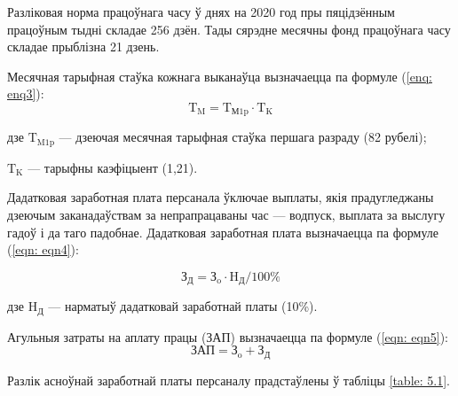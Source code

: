 Разліковая норма працоўнага часу ў днях на 2020 год пры пяцідзённым працоўным тыдні складае 256 дзён. Тады сярэдне месячны фонд працоўнага часу складае прыблізна 21 дзень.

Месячная тарыфная стаўка кожнага выканаўца вызначаецца па
формуле (\ref{enq: enq3}):
\begin{equation}
    \label{enq: enq3}
    \text{T}_\text{M} = \text{T}_\text{М1p} \cdot \text{T}_\text{K}
\end{equation}
\begin{Explanation}
    \item[дзе] $\text{T}_\text{M1p}$ --- дзеючая месячная тарыфная стаўка першага разраду (82 рубелі);
    \item $\text{T}_\text{K}$ --- тарыфны каэфіцыент (1,21).
\end{Explanation}

Дадатковая заработная плата персанала ўключае выплаты, якія
прадугледжаны дзеючым заканадаўствам за непрапрацаваны час ---
водпуск, выплата за выслугу гадоў і да таго падобнае.
Дадатковая заработная плата вызначаецца па формуле (\ref{eqn: eqn4}):

\begin{equation}
    \label{eqn: eqn4}
    \text{З}_\text{Д} = \text{З}_\text{o} \cdot \text{H}_\text{Д} / 100\%
\end{equation}
\begin{Explanation}
    \item[дзе] $\text{H}_\text{Д}$ --- нарматыў дадатковай заработнай платы (10\%).
\end{Explanation}

Агульныя затраты на аплату працы (ЗАП) вызначаецца па формуле
(\ref{eqn: eqn5}):
\begin{equation}
    \label{eqn: eqn5}
    \text{ЗАП} = \text{З}_\text{o} + \text{З}_\text{Д}
\end{equation}

Разлік асноўнай заработнай платы персаналу прадстаўлены ў табліцы
\ref{table: 5.1}.

